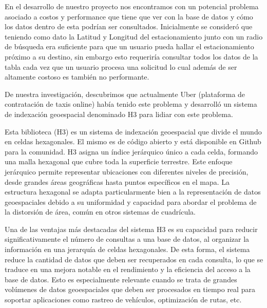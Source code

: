 En el desarrollo de nuestro proyecto nos encontramos con un potencial problema asociado a costos y performance que tiene que ver con la base de datos y cómo los datos dentro de esta podrían ser consultados. Inicialmente se consideró que teniendo como dato la Latitud y Longitud del estacionamiento junto con un radio de búsqueda era suficiente para que un usuario pueda hallar el estacionamiento próximo a su destino, sin embargo esto requeriría consultar todos los datos de la tabla cada vez que un usuario procesa una solicitud lo cual además de ser altamente costoso es también no performante.

De nuestra investigación, descubrimos que actualmente Uber (plataforma de contratación de taxis online) había tenido este problema y desarrolló un sistema de indexación geoespacial denominado H3 para lidiar con este problema.


Esta biblioteca (H3) es un sistema de indexación geoespacial que divide el mundo en celdas hexagonales. El mismo es de código abierto y está disponible en Github para la comunidad. H3 asigna un índice jerárquico único a cada celda, formando una malla hexagonal que cubre toda la superficie terrestre. Este enfoque jerárquico permite representar ubicaciones con diferentes niveles de precisión, desde grandes áreas geográficas hasta puntos específicos en el mapa. La estructura hexagonal se adapta particularmente bien a la representación de datos geoespaciales debido a su uniformidad y capacidad para abordar el problema de la distorsión de área, común en otros sistemas de cuadrícula.


Una de las ventajas más destacadas del sistema H3 es su capacidad para reducir significativamente el número de consultas a una base de datos, al organizar la información en una jerarquía de celdas hexagonales. De esta forma, el sistema reduce la cantidad de datos que deben ser recuperados en cada consulta, lo que se traduce en una mejora notable en el rendimiento y la eficiencia del acceso a la base de datos. Esto es especialmente relevante cuando se trata de grandes volúmenes de datos geoespaciales que deben ser procesados en tiempo real para soportar aplicaciones como rastreo de vehículos, optimización de rutas, etc.

